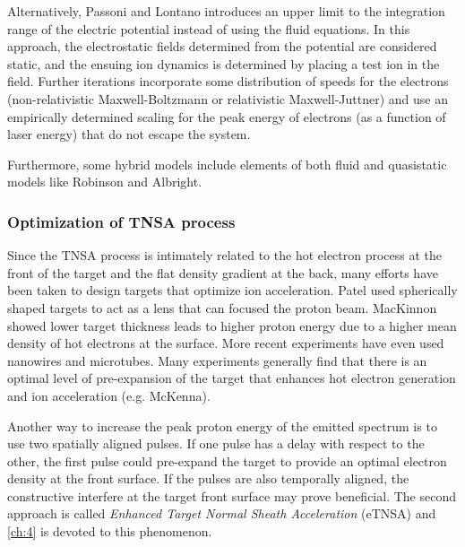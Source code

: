 Alternatively, Passoni and Lontano\cite{Passoni_2004_LaPB} introduces an upper limit to the integration range of the electric potential instead of using the fluid equations. In this approach, the electrostatic fields determined from the potential are considered static, and the ensuing ion dynamics is determined by placing a test ion in the field. Further iterations incorporate some distribution of speeds for the electrons (non-relativistic Maxwell-Boltzmann\cite{Lontano_2006_PoP} or relativistic Maxwell-Juttner\cite{Passoni_2008_PRL}) and use an empirically determined scaling for the peak energy of electrons (as a function of laser energy) that do not escape the system\cite{Perego_2012_RevSci}.

Furthermore, some hybrid models include elements of both fluid and quasistatic models like Robinson\cite{Robinson_2006_PRL} and Albright\cite{Albright_2006_PRL}.

\subsubsection{Optimization of TNSA process} \label{sec:tnsa_opt}

Since the TNSA process is intimately related to the hot electron process at the front of the target and the flat density gradient at the back, many efforts have been taken to design targets that optimize ion acceleration. Patel\cite{Patel_2003_PRL} used spherically shaped targets to act as a lens that can focused the proton beam. MacKinnon\cite{Mackinnon_2002_PRL} showed lower target thickness leads to higher proton energy due to a higher mean density of hot electrons at the surface. More recent experiments have even used nanowires\cite{Vallieres_2021_Nature} and microtubes\cite{Strehlow_2022_Nature}. Many experiments generally find that there is an optimal level of pre-expansion of the target that enhances hot electron generation and ion acceleration (e.g. McKenna\cite{McKenna_2008_LaPB}).

Another way to increase the peak proton energy of the emitted spectrum is to use two spatially aligned pulses. If one pulse has a delay with respect to the other, the first pulse could pre-expand the target to provide an optimal electron density at the front surface\cite{Ferri_2018_PoP}. If the pulses are also temporally aligned, the constructive interfere at the target front surface may prove beneficial\cite{Ferri_2019_Nat_Comm}. The second approach is called \emph{Enhanced Target Normal Sheath Acceleration} (eTNSA) and \cref{ch:4} is devoted to this phenomenon. 

